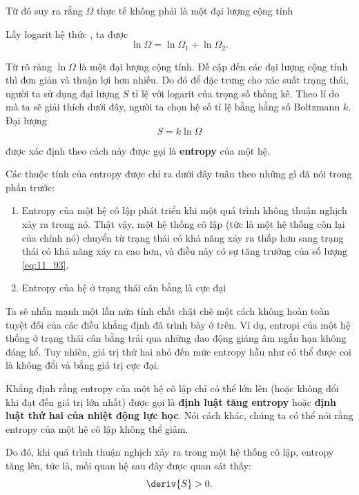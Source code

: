 \noindent
Từ đó suy ra rằng $\Omega$ thực tế không phải là một đại lượng cộng tính

Lấy logarit hệ thức , ta được
\begin{equation}\label{công thức:11_92}
	\ln{\Omega} = \ln{\Omega_1} + \ln{\Omega_2}.
\end{equation}

\noindent
Từ  rõ ràng $\ln{\Omega}$ là một đại lượng cộng tính. Đề cập đến các đại lượng cộng tính thì đơn giản và thuận lợi hơn nhiều. Do đó để đặc trưng cho xác suất trạng thái, người ta sử dụng đại lượng $S$ tỉ lệ với logarit của trọng số thống kê. Theo lí do mà ta sẽ giải thích dưới đây, người ta chọn hệ số tỉ lệ bằng hằng số Boltzmann $k$. Đại lượng
\begin{equation}\label{công thức:11_93}
	S = k \ln{\Omega}
\end{equation}

\noindent
được xác định theo cách này được gọi là \textbf {entropy} của một hệ.

Các thuộc tính của entropy được chỉ ra dưới đây tuân theo những gì đã nói trong phần trước:
\begin{enumerate}[1.]
	\item Entropy của một hệ cô lập phát triển khi một quá trình không thuận nghịch xảy ra trong nó. Thật vậy, một hệ thống cô lập (tức là một hệ thống còn lại của chính nó) chuyển từ trạng thái có khả năng xảy ra thấp hơn sang trạng thái có khả năng xảy ra cao hơn, và điều này có sự tăng trưởng của số lượng \eqref{eq:11_93}.
	\item Entropy của hệ ở trạng thái cân bằng là cực đại
\end{enumerate}

Ta sẽ nhấn mạnh một lần nữa tính chất chặt chẽ một cách không hoàn toàn tuyệt đối của các điều khẳng định đã trình bày ở trên. Ví dụ, entropi của một hệ thống ở trạng thái cân bằng trải qua những dao động giáng âm ngắn hạn không đáng kể. Tuy nhiên, giá trị thứ hai nhỏ đến mức entropy hầu như có thể được coi là không đổi và bằng giá trị cực đại.

Khẳng định rằng entropy của một hệ cô lập chỉ có thể lớn lên (hoặc không đổi khi đạt đến giá trị lớn nhất) được gọi là \textbf {định luật tăng entropy} hoặc \textbf {định luật thứ hai của nhiệt động lực học}. Nói cách khác, chúng ta có thể nói rằng entropy của một hệ cô lập không thể giảm.

Do đó, khi quá trình thuận nghịch xảy ra trong một hệ thống cô lập, entropy tăng lên, tức là, mối quan hệ sau đây được quan sát thấy:
\begin{equation}\label{công thức:11_94}
	\deriv{S} > 0.
\end{equation}

